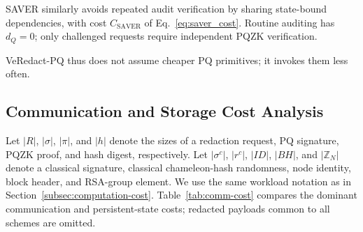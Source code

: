 \documentclass[lettersize,journal]{IEEEtran}
\begin{document}
SAVER similarly avoids repeated audit verification by sharing
state-bound dependencies, with cost $C_{\mathrm{SAVER}}$ of
Eq.~\eqref{eq:saver_cost}. Routine auditing has $d_Q=0$;
only challenged requests require independent PQZK verification.

VeRedact-PQ thus does not assume cheaper PQ primitives; it invokes them
less often.


\subsection{Communication and Storage Cost Analysis}
\label{subsec:communication-cost}

Let $|R|$, $|\sigma|$, $|\pi|$, and $|h|$ denote the sizes of a
redaction request, PQ signature, PQZK proof, and hash digest,
respectively. Let $|\sigma^{c}|$, $|r^{c}|$, $|ID|$, $|BH|$, and
$|\mathbb{Z}_N|$ denote a classical signature, classical
chameleon-hash randomness, node identity, block header, and RSA-group
element. We use the same workload notation as in
Section~\ref{subsec:computation-cost}. Table~\ref{tab:comm-cost}
compares the dominant communication and persistent-state costs;
redacted payloads common to all schemes are omitted.
\end{document}
